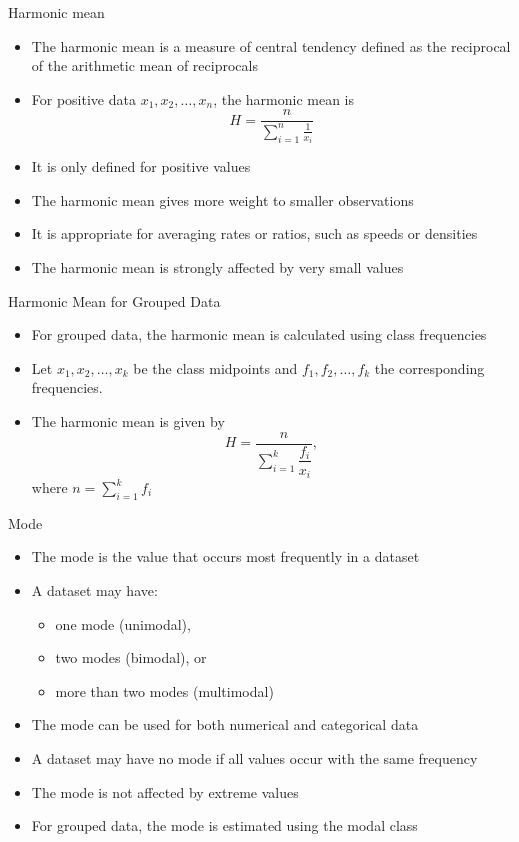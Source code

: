 \documentclass[12pt, aspectratio=169]{beamer}
\begin{document}
    \begin{frame}{Harmonic mean}
        \begin{itemize}
            \item The harmonic mean is a measure of central tendency defined as the reciprocal of the arithmetic mean of reciprocals
            \item For positive data $x_1, x_2, \dots, x_n$, the harmonic mean is
            \[
                H = \frac{n}{\sum_{i=1}^{n} \frac{1}{x_i}}
            \]
            \item It is only defined for positive values
            \item The harmonic mean gives more weight to smaller observations
            \item It is appropriate for averaging rates or ratios, such as speeds or densities
            \item The harmonic mean is strongly affected by very small values
        \end{itemize}
    \end{frame}


    \begin{frame}{Harmonic Mean for Grouped Data}
        \begin{itemize}
            \item For grouped data, the harmonic mean is calculated using class frequencies
            \item Let $x_1, x_2, \dots, x_k$ be the class midpoints and $f_1, f_2, \dots, f_k$ the corresponding frequencies.
            \item The harmonic mean is given by
            \[
                H = \frac{n}{\sum_{i=1}^{k} \dfrac{f_i}{x_i}},
            \]
            where $n = \sum_{i=1}^{k} f_i$
        \end{itemize}
    \end{frame}


    \begin{frame}{Mode}
        \begin{itemize}
            \item The mode is the value that occurs most frequently in a dataset
            \item A dataset may have:
            \begin{itemize}
                \item one mode (unimodal),
                \item two modes (bimodal), or
                \item more than two modes (multimodal)
            \end{itemize}
            \item The mode can be used for both numerical and categorical data
            \item A dataset may have no mode if all values occur with the same frequency
            \item The mode is not affected by extreme values
            \item For grouped data, the mode is estimated using the modal class
        \end{itemize}
    \end{frame}
\end{document}
